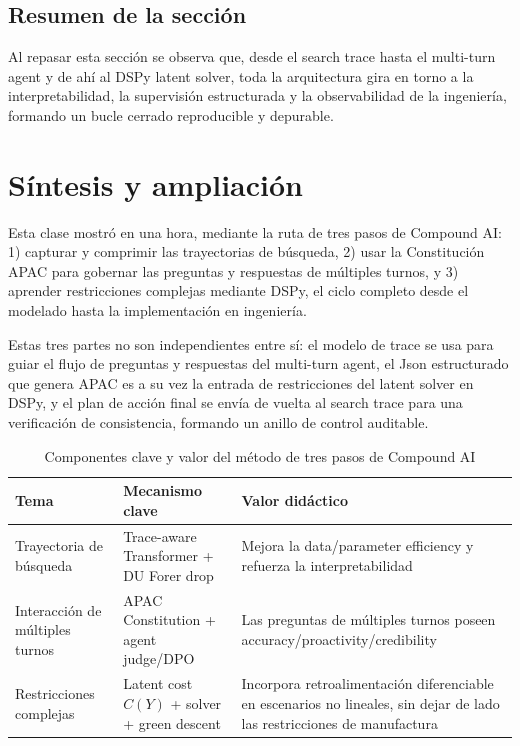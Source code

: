 \documentclass[a4paper]{article}
\begin{document}
\subsection{Resumen de la sección}
Al repasar esta sección se observa que, desde el search trace hasta el multi-turn agent y de ahí al DSPy latent solver, toda la arquitectura gira en torno a la interpretabilidad, la supervisión estructurada y la observabilidad de la ingeniería, formando un bucle cerrado reproducible y depurable.

\section{Síntesis y ampliación}

Esta clase mostró en una hora, mediante la ruta de tres pasos de Compound AI: 1) capturar y comprimir las trayectorias de búsqueda, 2) usar la Constitución APAC para gobernar las preguntas y respuestas de múltiples turnos, y 3) aprender restricciones complejas mediante DSPy, el ciclo completo desde el modelado hasta la implementación en ingeniería.

Estas tres partes no son independientes entre sí: el modelo de trace se usa para guiar el flujo de preguntas y respuestas del multi-turn agent, el Json estructurado que genera APAC es a su vez la entrada de restricciones del latent solver en DSPy, y el plan de acción final se envía de vuelta al search trace para una verificación de consistencia, formando un anillo de control auditable.

\begin{table}[H]
\centering
\begin{tabular}{lp{5cm}p{6cm}}
\toprule
Tema & Mecanismo clave & Valor didáctico \\
\midrule
Trayectoria de búsqueda & Trace-aware Transformer + DU Forer drop & Mejora la data/parameter efficiency y refuerza la interpretabilidad \\
Interacción de múltiples turnos & APAC Constitution + agent judge/DPO & Las preguntas de múltiples turnos poseen accuracy/proactivity/credibility \\
Restricciones complejas & Latent cost \(C(Y)\) + solver + green descent & Incorpora retroalimentación diferenciable en escenarios no lineales, sin dejar de lado las restricciones de manufactura \\
\bottomrule
\end{tabular}
\caption{Componentes clave y valor del método de tres pasos de Compound AI}
\end{table}
\end{document}
